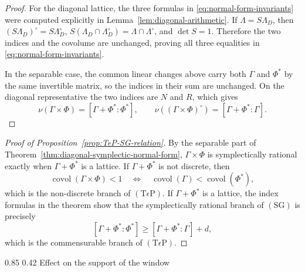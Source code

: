 \documentclass[11pt,reqno]{amsart}
\makeatletter
\numberwithin{equation}{section}
\renewcommand\subsection{\@startsection{subsection}{2}{\z@}%
  {0.85\baselineskip \@plus 0.25\baselineskip \@minus 0.10\baselineskip}%
  {0.42\baselineskip}%
  {\normalfont\bfseries}}
\theoremstyle{definition}
\theoremstyle{remark}
\newcommand{\covol}{\operatorname{covol}}
\newcommand{\TeP}{\ensuremath{(\mathrm{T}\epsilon\mathrm{P})}\xspace}
\newcommand{\SG}{\ensuremath{(\mathrm{SG})}\xspace}
\makeatother
\begin{document}
\begin{proof}
For the diagonal lattice, the three formulas in
\eqref{eq:normal-form-invariants} were computed explicitly in
Lemma~\ref{lem:diagonal-arithmetic}.  If $\Lambda=S\Lambda_D$, then
$(S\Lambda_D)^\circ=S\Lambda_D^\circ$,
$S(\Lambda_D\cap\Lambda_D^\circ)
 =\Lambda\cap\Lambda^\circ$, and $\det S=1$.  Therefore the two indices and
the covolume are unchanged, proving all three equalities in
\eqref{eq:normal-form-invariants}.

In the separable case, the common linear changes above carry both $\Gamma$
and $\Phi^*$ by the same invertible matrix, so the indices in their sum are
unchanged.  On the diagonal representative the two indices are $N$ and $R$,
which gives
\[
 \nu(\Gamma\times\Phi)=[\Gamma+\Phi^*:\Phi^*],
 \qquad
 \nu((\Gamma\times\Phi)^\circ)=[\Gamma+\Phi^*:\Gamma].
\]
\end{proof}

\begin{proof}[Proof of Proposition~\ref{prop:TeP-SG-relation}]
By the separable part of
Theorem~\ref{thm:diagonal-symplectic-normal-form},
$\Gamma\times\Phi$ is symplectically rational exactly when
$\Gamma+\Phi^*$ is a lattice.  If $\Gamma+\Phi^*$ is not discrete, then
\[
 \covol(\Gamma\times\Phi)<1
 \quad\Longleftrightarrow\quad
 \covol(\Gamma)<\covol(\Phi^*),
\]
which is the non-discrete branch of $\TeP$.  If $\Gamma+\Phi^*$ is a lattice, the index
formulas in the theorem show that the symplectically rational branch of
$\SG$ is precisely
\[
                         [\Gamma+\Phi^*:\Phi^*]\ge[\Gamma+\Phi^*:\Gamma]+d,
\]
which is the commensurable branch of $\TeP$.
\end{proof}

\subsection{Effect on the support of the window}
\label{subsec:metaplectic-implementation}
\end{document}
